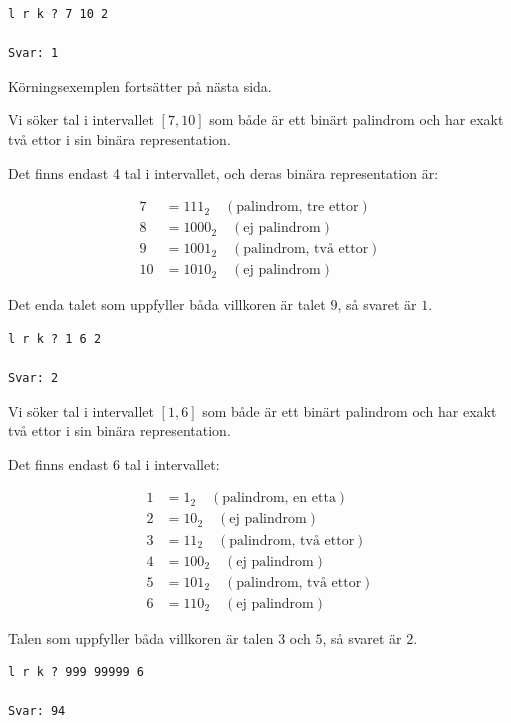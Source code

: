 \begin{verbatim}
l r k ? 7 10 2

Svar: 1
\end{verbatim}


\vspace{1cm}

\begin{center}
  {\LARGE Körningsexemplen fortsätter på nästa sida.}
\end{center}

\newpage

Vi söker tal i intervallet $[7, 10]$ som både är ett binärt palindrom och har exakt två ettor i sin binära representation.

Det finns endast 4 tal i intervallet, och deras binära representation är:

\begin{align*}
7 &= 111_2 \quad (\text{palindrom, tre ettor}) \\
8 &= 1000_2 \quad (\text{ej palindrom}) \\
9 &= 1001_2 \quad (\text{palindrom, två ettor}) \\
10 &= 1010_2 \quad (\text{ej palindrom})
\end{align*}

Det enda talet som uppfyller båda villkoren är talet $9$, så svaret är $1$.

\vspace{1cm}

\begin{verbatim}
l r k ? 1 6 2

Svar: 2
\end{verbatim}
Vi söker tal i intervallet $[1, 6]$ som både är ett binärt palindrom och har exakt två ettor i sin binära representation.

Det finns endast 6 tal i intervallet:

\begin{align*}
1 &= 1_2 \quad (\text{palindrom, en etta}) \\
2 &= 10_2 \quad (\text{ej palindrom}) \\
3 &= 11_2 \quad (\text{palindrom, två ettor}) \\
4 &= 100_2 \quad (\text{ej palindrom}) \\
5 &= 101_2 \quad (\text{palindrom, två ettor}) \\
6 &= 110_2 \quad (\text{ej palindrom})
\end{align*}

Talen som uppfyller båda villkoren är talen $3$ och $5$, så svaret är $2$.

\vspace{1cm}

\begin{verbatim}
l r k ? 999 99999 6

Svar: 94
\end{verbatim}


